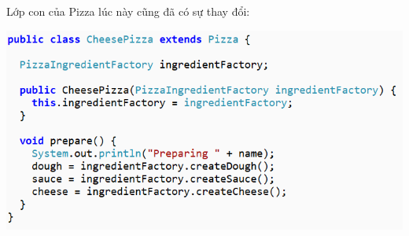 Lớp con của Pizza lúc này cũng đã có sự thay đổi:

\begin{center}
	\includegraphics{GALLEYS/images/chapter5/images14}
\end{center}


